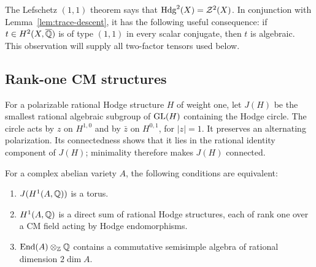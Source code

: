 The Lefschetz \((1,1)\) theorem says that
\(\operatorname{Hdg}^2(X)=\mathcal Z^2(X)\).  In conjunction with
Lemma~\ref{lem:trace-descent}, it has the following useful consequence:
if \(t\in H^2(X,\overline{\mathbb{Q}})\) is of type \((1,1)\) in every scalar
conjugate, then \(t\) is algebraic.  This observation will supply all
two-factor tensors used below.

\subsection{Rank-one CM structures}

For a polarizable rational Hodge structure \(H\) of weight one, let
\(J(H)\) be the smallest rational algebraic subgroup of \(\operatorname{GL}(H)\)
containing the Hodge circle.  The circle acts by \(z\) on \(H^{1,0}\)
and by \(\bar z\) on \(H^{0,1}\), for \(|z|=1\).  It preserves an
alternating polarization.  Its connectedness shows that it lies in the
rational identity component of \(J(H)\); minimality therefore makes
\(J(H)\) connected.

\begin{lemma}\label{lem:toric-cm}
For a complex abelian variety \(A\), the following conditions are
equivalent:
\begin{enumerate}[label=\textup{(\roman*)}]
\item \(J(H^1(A,\mathbb{Q}))\) is a torus.
\item \(H^1(A,\mathbb{Q})\) is a direct sum of rational Hodge structures,
      each of rank one over a CM field acting by Hodge endomorphisms.
\item \(\operatorname{End}(A)\otimes_{\mathbb{Z}}\mathbb{Q}\) contains a commutative semisimple
      algebra of rational dimension \(2\dim A\).
\end{enumerate}
\end{lemma}

